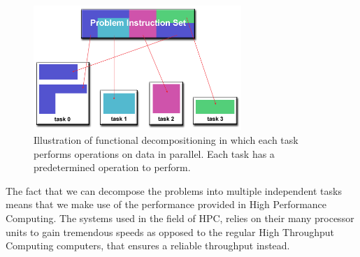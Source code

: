 \begin{figure}[htbp]
\centering
\includegraphics[width=0.7\textwidth]{Analysis/Supercomputing/functional_decomp.png}
\caption{Illustration of functional decompositioning in which each task performs operations on data in parallel. Each task has a predetermined operation to perform. \cite{compLLNL}}\label{fig:fun}
\end{figure}

The fact that we can decompose the problems into multiple independent tasks means that we make use of the performance provided in High Performance Computing. The systems used in the field of HPC, relies on their many processor units to gain tremendous speeds as opposed to the regular High Throughput Computing computers, that ensures a reliable throughput instead.